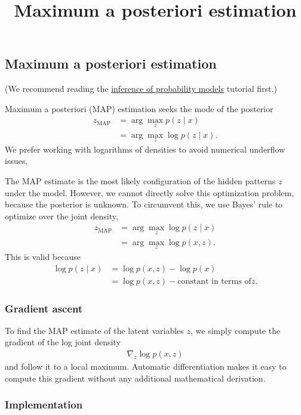\title{Maximum a posteriori estimation}

\subsection{Maximum a posteriori estimation}

(We recommend reading the 
\href{tut_inference.html}{inference of probability models}
tutorial first.)

Maximum a posteriori (MAP) estimation seeks the mode of the posterior
\begin{align*}
  z_\text{MAP}
  &=
  \arg \max_z
  p(z \mid x)\\
  &=
  \arg \max_z
  \log p(z \mid x).
\end{align*}
We prefer working with logarithms of densities to avoid numerical underflow
issues.

The MAP estimate is the most likely configuration of the hidden patterns $z$
under the model. However, we cannot directly solve this optimization problem,
because the posterior is unknown. To circumvent this, we use Bayes' rule to
optimize over the joint density,
\begin{align*}
  z_\text{MAP}
  &=
  \arg \max_z
  \log p(z \mid x)\\
  &=
  \arg \max_z
  \log p(x, z).  
\end{align*}
This is valid because
\begin{align*}
  \log p(z \mid x)
  &=
  \log p(x, z) - \log p(x)\\
  &=
  \log p(x, z) - \text{constant in terms of} z.
\end{align*}

\subsubsection{Gradient ascent}

To find the MAP estimate of the latent variables $z$, we simply compute the
gradient of the log joint density
\begin{align*}
  \nabla_z
  \log p(x, z)
\end{align*}
and follow it to a local maximum. Automatic differentiation makes it easy to
compute this gradient without any additional mathematical derivation.

\subsubsection{Implementation}

